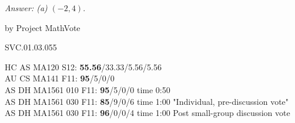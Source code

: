 
{\it Answer:  (a)} $(-2,4)$.

\medskip
by Project MathVote

SVC.01.03.055

HC AS MA120 S12: {\bf 55.56}/33.33/5.56/5.56  \\
AU CS MA141 F11: {\bf 95}/5/0/0 \\
AS DH MA1561 010 F11: {\bf 95}/5/0/0 time 0:50  \\
AS DH MA1561 030 F11: {\bf 85}/9/0/6 time 1:00 "Individual, pre-discussion vote" \\
AS DH MA1561 030 F11: {\bf 96}/0/0/4 time 1:00 Post small-group discussion vote \\
